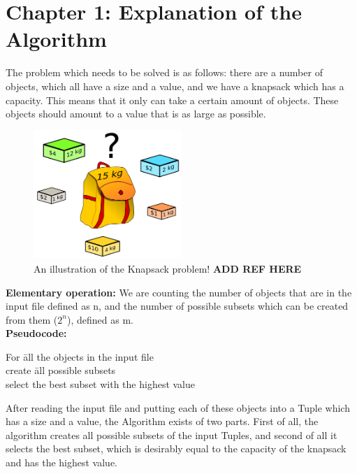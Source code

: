 \documentclass{article}
\begin{document}
\section*{Chapter 1:  Explanation of the Algorithm} 
 \noindent The problem which needs to be solved is as follows: there are a number of objects, which all have a size and a value, and we have a knapsack which has a capacity. This means that it only can take a certain amount of objects. These objects should amount to a value that is as large as possible.\\

\begin{figure}[h!]
  \centering
      \includegraphics[width=0.5\textwidth]{Knapsack.png}
  \caption{An illustration of the Knapsack problem! \textbf{ADD REF HERE} }
\end{figure}

\textbf{Elementary operation:} We are counting the number of objects that are in the input file defined as n, and the number of possible subsets which can be created from them ($2^n$), defined as m.\\

\noindent \textbf{Pseudocode:}
\begin{tabbing}
For \= all the objects in the input file \\
\> create \= all possible subsets	\\
\> select the best subset with the highest value\\
\end{tabbing}

After reading the input file and putting each of these objects into a Tuple which has a size and a value, the Algorithm exists of two parts. First of all, the algorithm creates all possible subsets of the input Tuples, and second of all it selects the best subset, which is desirably equal to the capacity of the knapsack and has the highest value. \\
 
\end{document}
